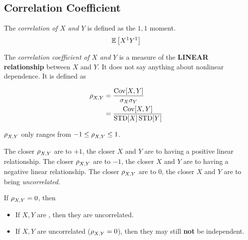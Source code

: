 \subsection{Correlation Coefficient}\label{subsec:Correlation_Coefficient}
\begin{definition}[Correlation]\label{def:Correlation}
  The \emph{correlation of $X$ and $Y$} is defined as the $1,1$ moment.
  \begin{equation}\label{eq:Correlation}
    \operatorname{\operatorname{\mathbb{E}}} \left[X^{1}Y^{1} \right]
  \end{equation}
\end{definition}

\begin{definition}\label{def:Correlation_Coefficient}
  The \emph{correlation coefficient of $X$ and $Y$} is a measure of the \textbf{LINEAR relationship} between $X$ and $Y$.
  It does not say anything about nonlinear dependence.
  It is defined as

  \begin{equation}\label{eq:Correlation_Coefficient}
    \begin{aligned}
      \operatorname{\rho}_{X,Y} &= \frac{\operatorname{\operatorname{Cov}}[X,Y]}{\sigma_{X} \sigma_{Y}} \\
      &= \frac{\operatorname{\operatorname{Cov}}[X,Y]}{\operatorname{\operatorname{STD}}[X] \operatorname{\operatorname{STD}}[Y]} \\
    \end{aligned}
  \end{equation}

  \begin{remark}
    $\operatorname{\rho}_{X,Y}$ only ranges from $-1 \leq \operatorname{\rho}_{X,Y} \leq 1$.
  \end{remark}

  \begin{remark}
    The closer $\operatorname{\rho}_{X,Y}$ are to $+1$, the closer $X$ and $Y$ are to having a positive linear relationship.
    The closer $\operatorname{\rho}_{X,Y}$ are to $-1$, the closer $X$ and $Y$ are to having a negative linear relationship.
    The closer $\operatorname{\rho}_{X,Y}$ are to $0$, the closer $X$ and $Y$ are to being \emph{uncorrelated.}
  \end{remark}
\end{definition}

If $\operatorname{\rho}_{X,Y} = 0$, then
\begin{itemize}[noitemsep]
\item If $X,Y$ are , then they are uncorrelated.
\item If $X,Y$ are uncorrelated ($\operatorname{\rho}_{X,Y} = 0$), then they may still \textbf{not} be independent.
\end{itemize}

